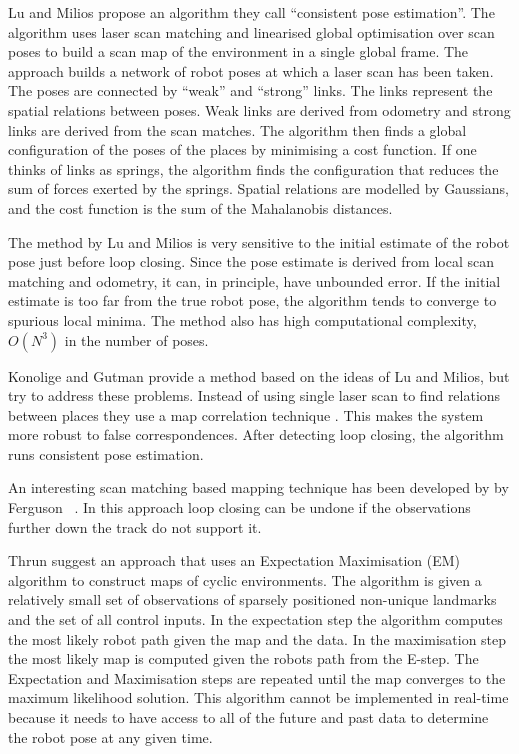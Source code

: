Lu and Milios \cite{lu97:_global} propose an algorithm they call
``consistent pose estimation''. The algorithm uses laser scan matching
and linearised global optimisation over scan poses to build a scan map
of the environment in a single global frame. The approach builds a
network of robot poses at which a laser scan has been taken. The poses
are connected by ``weak'' and ``strong'' links. The links represent
the spatial relations between poses. Weak links are derived from
odometry and strong links are derived from the scan matches. The
algorithm then finds a global configuration of the poses of the places
by minimising a cost function. If one thinks of links as springs, the
algorithm finds the configuration that reduces the sum of forces
exerted by the springs. Spatial relations are modelled by Gaussians,
and the cost function is the sum of the Mahalanobis distances.

The method by Lu and Milios is very sensitive to the initial estimate
of the robot pose just before loop closing. Since the pose estimate is
derived from local scan matching and odometry, it can, in principle,
have unbounded error. If the initial estimate is too far from the true
robot pose, the algorithm tends to converge to spurious local minima.
The method also has high computational complexity, $O(N^3)$ in the number of poses.

Konolige and Gutman
\cite{konolige99:_increm_mappin_large_cyclic_envir} provide a method
based on the ideas of Lu and Milios, but try to address these
problems. Instead of using single laser scan to find relations between
places they use a map correlation technique \cite{konolige99}. This
makes the system more robust to false correspondences. After detecting
loop closing, the algorithm runs consistent pose estimation. 

An interesting scan matching based mapping technique has been
developed by by Ferguson \etal\ \cite{fergusson2003}. In this
approach loop closing can be undone if the observations further down
the track do not support it.

Thrun \etal \cite{slam_thrun98b,Thrun98a,thrun98:_probab} suggest an
approach that uses an Expectation Maximisation (EM) algorithm to
construct maps of cyclic environments. The algorithm is given a
relatively small set of observations of sparsely positioned non-unique
landmarks and the set of all control inputs. In the expectation step the
algorithm computes the most likely robot path given the map and the
data. In the maximisation step the most likely map is computed given
the robots path from the E-step. The Expectation and Maximisation
steps are repeated until the map converges to the maximum likelihood
solution. This algorithm cannot be implemented in real-time because
it needs to have access to all of the future and past data to
determine the robot pose at any given time. %

